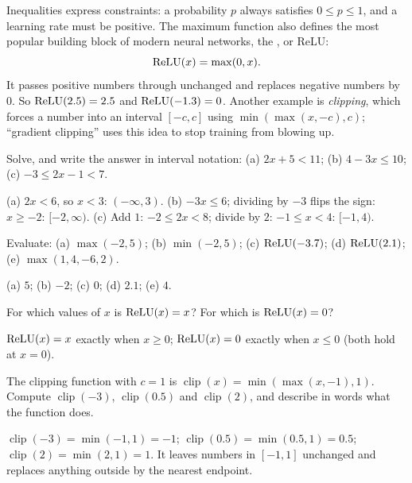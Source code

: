 \begin{mlnote}
Inequalities express constraints: a probability $p$ always satisfies
$0 \le p \le 1$, and a learning rate must be positive. The maximum function
also defines the most popular building block of modern neural networks, the
, or ReLU:
\[
  \operatorname{ReLU}(x) = \max(0, x) .
\]
It passes positive numbers through unchanged and replaces negative numbers by
$0$. So $\operatorname{ReLU}(2.5) = 2.5$ and $\operatorname{ReLU}(-1.3) = 0$. Another example is
\emph{clipping}, which forces a number into an interval $[-c, c]$ using
$\min(\max(x, -c), c)$; ``gradient clipping'' uses this idea to stop training
from blowing up.
\end{mlnote}

\sectionexercises

\begin{exercise}
Solve, and write the answer in interval notation: (a) $2x + 5 < 11$;
(b) $4 - 3x \le 10$; (c) $-3 \le 2x - 1 < 7$.
\end{exercise}
\begin{solution}
(a) $2x < 6$, so $x < 3$: $(-\infty, 3)$.
(b) $-3x \le 6$; dividing by $-3$ flips the sign: $x \ge -2$:
$[-2, \infty)$.
(c) Add $1$: $-2 \le 2x < 8$; divide by $2$: $-1 \le x < 4$: $[-1, 4)$.
\end{solution}

\begin{exercise}
Evaluate: (a) $\max(-2, 5)$; (b) $\min(-2, 5)$; (c) $\operatorname{ReLU}(-3.7)$;
(d) $\operatorname{ReLU}(2.1)$; (e) $\max(1, 4, -6, 2)$.
\end{exercise}
\begin{solution}
(a) $5$; (b) $-2$; (c) $0$; (d) $2.1$; (e) $4$.
\end{solution}

\begin{exercise}
For which values of $x$ is $\operatorname{ReLU}(x) = x$? For which is $\operatorname{ReLU}(x) = 0$?
\end{exercise}
\begin{solution}
$\operatorname{ReLU}(x) = x$ exactly when $x \ge 0$; $\operatorname{ReLU}(x) = 0$ exactly when $x \le 0$
(both hold at $x = 0$).
\end{solution}

\begin{exercise}
The clipping function with $c = 1$ is $\operatorname{clip}(x) =
\min(\max(x, -1), 1)$. Compute $\operatorname{clip}(-3)$,
$\operatorname{clip}(0.5)$ and $\operatorname{clip}(2)$, and describe in words
what the function does.
\end{exercise}
\begin{solution}
$\operatorname{clip}(-3) = \min(-1, 1) = -1$;
$\operatorname{clip}(0.5) = \min(0.5, 1) = 0.5$;
$\operatorname{clip}(2) = \min(2, 1) = 1$. It leaves numbers in $[-1,1]$
unchanged and replaces anything outside by the nearest endpoint.
\end{solution}

